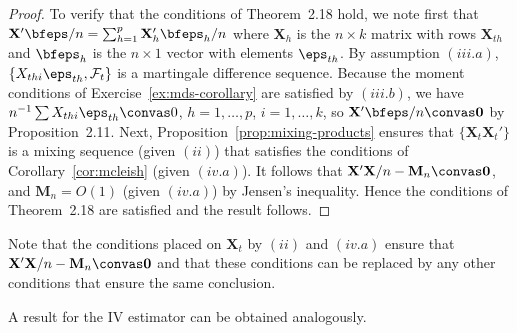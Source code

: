 \begin{proof}
To verify that the conditions of Theorem~2.18 hold, we note first that $\mathbf{X}'\bfeps/n = \sum_{h=1}^{p} \mathbf{X}_h' \bfeps_h / n$ where $\mathbf{X}_h$ is the $n \times k$ matrix with rows $\mathbf{X}_{th}$ and $\bfeps_h$ is the $n \times 1$ vector with elements $\eps_{th}$. By assumption $(iii.a)$, $\{X_{thi} \eps_{th}, \mathcal{F}_t\}$ is a martingale difference sequence. Because the moment conditions of Exercise~\ref{ex:mds-corollary} are satisfied by $(iii.b)$, we have $n^{-1} \sum X_{thi} \eps_{th} \convas 0$, $h = 1, \ldots, p$, $i = 1, \ldots, k$, so $\mathbf{X}'\bfeps/n \convas \mathbf{0}$ by Proposition~2.11. Next, Proposition~\ref{prop:mixing-products} ensures that $\{\mathbf{X}_t \mathbf{X}_t'\}$ is a mixing sequence (given $(ii)$) that satisfies the conditions of Corollary~\ref{cor:mcleish} (given $(iv.a)$). It follows that $\mathbf{X}'\mathbf{X}/n - \mathbf{M}_n \convas \mathbf{0}$, and $\mathbf{M}_n = O(1)$ (given $(iv.a)$) by Jensen's inequality. Hence the conditions of Theorem~2.18 are satisfied and the result follows. \qedhere
\end{proof}

Note that the conditions placed on $\mathbf{X}_t$ by $(ii)$ and $(iv.a)$ ensure that $\mathbf{X}'\mathbf{X}/n - \mathbf{M}_n \convas \mathbf{0}$ and that these conditions can be replaced by any other conditions that ensure the same conclusion.

A result for the IV estimator can be obtained analogously.


